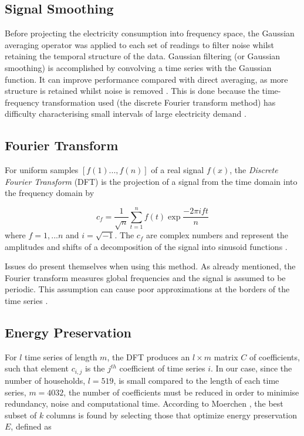 \subsection*{Signal Smoothing}

Before projecting the electricity consumption into frequency space, the Gaussian averaging operator was applied to each set of readings to filter noise whilst retaining the temporal structure of the data. Gaussian filtering (or Gaussian smoothing) is accomplished by convolving a time series with the Gaussian function. It can improve performance compared with direct averaging, as more structure is retained whilst noise is removed \cite{Nixon}. This is done because the time-frequency transformation used (the discrete Fourier transform method) has difficulty characterising small intervals of large electricity demand \cite{Graps}.



\householdConv %



\subsection*{Fourier Transform}

For uniform samples $[f(1)...,f(n)]$ of a real signal $f(x)$, the \textit{Discrete Fourier Transform} (DFT) is the projection of a signal from the time domain into the frequency domain by

\[c_f=\frac{1}{\sqrt{n}}\sum_{t=1}^nf(t)\exp{\frac{-2\pi ift}{n}}\]
where $f=1,...n$ and $i=\sqrt{-1}$. The $c_f$ are complex numbers and represent
the amplitudes and shifts of a decomposition of the signal into sinusoid functions \cite{Moerchen}.


Issues do present themselves when using this method. As already mentioned, the Fourier transform measures global frequencies and the signal is assumed to be periodic. This assumption can cause poor approximations at the borders of the time series \cite{Moerchen}.

\subsection*{Energy Preservation}

For $l$ time series of length $m$, the DFT produces an $l \times m$ matrix $C $ of coefficients, such that element $c_{i,j}$ is the $j^{th}$ coefficient of time series $i$. In our case, since the number of households, $l=519$, is small compared to the length of each time series, $m=4032$, the number of coefficients must be reduced in order to minimise redundancy, noise and computational time. According to Moerchen \cite{Moerchen}, the best subset of $k$ columns is found by selecting those that optimize energy preservation $E$, defined as

